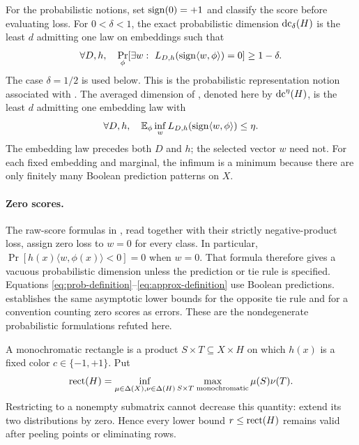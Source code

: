 For the probabilistic notions, set $\operatorname{sign}(0)=+1$ and classify the score before evaluating loss. For $0<\delta<1$, the exact probabilistic dimension $\operatorname{dc}_\delta(H)$ is the least $d$ admitting one law on embeddings such that
\begin{equation}\label{eq:prob-definition}
 \forall D,h,\quad
 \Pr_\phi\!\left[\exists w:\ L_{D,h}(\operatorname{sign}\langle w,\phi\rangle)=0\right]\ge1-\delta.
\end{equation}
The case $\delta=1/2$ is used below. This is the probabilistic representation notion associated with \citet{CMW25}. The averaged dimension of \citet{KMS20}, denoted here by $\operatorname{dc}^\eta(H)$, is the least $d$ admitting one embedding law with
\begin{equation}\label{eq:approx-definition}
 \forall D,h,\quad
 \mathbb E_\phi\inf_w L_{D,h}(\operatorname{sign}\langle w,\phi\rangle)\le\eta.
\end{equation}
The embedding law precedes both $D$ and $h$; the selected vector $w$ need not. For each fixed embedding and marginal, the infimum is a minimum because there are only finitely many Boolean prediction patterns on $X$.

\paragraph{Zero scores.}
The raw-score formulas in \citet[Section~4]{FKS26}, read together with their strictly negative-product loss, assign zero loss to $w=0$ for every class. In particular, $\Pr[h(x)\langle w,\phi(x)\rangle<0]=0$ when $w=0$. That formula therefore gives a vacuous probabilistic dimension unless the prediction or tie rule is specified. Equations \eqref{eq:prob-definition}--\eqref{eq:approx-definition} use Boolean predictions.  establishes the same asymptotic lower bounds for the opposite tie rule and for a convention counting zero scores as errors. These are the nondegenerate probabilistic formulations refuted here.

A monochromatic rectangle is a product $S\times T\subseteq X\times H$ on which $h(x)$ is a fixed color $c\in\{-1,+1\}$. Put
\begin{equation}\label{eq:rect-definition}
 \operatorname{rect}(H)=\inf_{\mu\in\Delta(X),\nu\in\Delta(H)}
 \max_{S\times T\text{ monochromatic}}\mu(S)\nu(T).
\end{equation}
Restricting to a nonempty submatrix cannot decrease this quantity: extend its two distributions by zero. Hence every lower bound $r\le\operatorname{rect}(H)$ remains valid after peeling points or eliminating rows.

